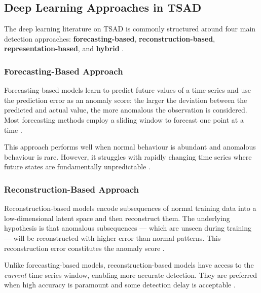 \documentclass[twoside,11pt,openright]{report}
\begin{document}
\subsection{Deep Learning Approaches in TSAD}
\label{sec:dl_approaches}
 
The deep learning literature on TSAD is commonly structured around four
main detection approaches: \textbf{forecasting-based},
\textbf{reconstruction-based}, \textbf{representation-based}, and
\textbf{hybrid} \citep{darban2024survey}.
 
\subsubsection{Forecasting-Based Approach}
\label{sec:forecasting_based}
 
Forecasting-based models learn to predict future values of a time series and use the prediction error as an anomaly score:
the larger the deviation between the predicted and actual value, the more anomalous the observation is considered.
Most forecasting methods employ a sliding window to forecast one point at a time \citep{darban2024survey}.
 
This approach performs well when normal behaviour is abundant and anomalous behaviour is rare.
However, it struggles with rapidly changing time series where future states are fundamentally unpredictable \citep{darban2024survey}.
 
 
\subsubsection{Reconstruction-Based Approach}
\label{sec:reconstruction_based}
 
Reconstruction-based models encode subsequences of normal training data into a low-dimensional latent space and then reconstruct them.
The underlying hypothesis is that anomalous subsequences --- which are unseen during training --- will be reconstructed with higher error than normal patterns.
This reconstruction error constitutes the anomaly score \citep{darban2024survey}.
 
Unlike forecasting-based models, reconstruction-based models have access to the \textit{current} time series window, enabling more accurate detection.
They are preferred when high accuracy is paramount and some detection delay is acceptable \citep{darban2024survey}.
 
\end{document}
